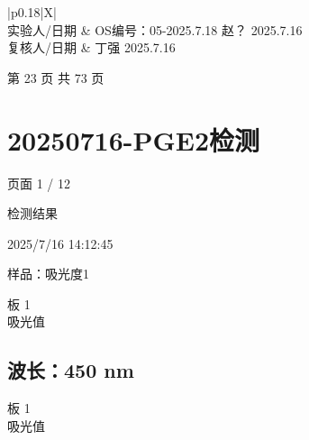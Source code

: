 \documentclass[UTF8,10pt,a4paper,fontset=fandol]{ctexart}
\newcommand{\fieldvalue}[1]{#1}
\newcommand{\handwritten}[1]{#1}
\begin{document}
\noindent
\begin{tabularx}{\textwidth}{|p{}|X|}
\hline
{}\\
\hline
实验人/日期 &
\fieldvalue{\handwritten{OS编号：05-2025.7.18}}
\hspace{2em}
\fieldvalue{\handwritten{赵？ 2025.7.16}}\\
\hline
复核人/日期 &
\fieldvalue{\handwritten{丁强 2025.7.16}}\\
\hline
\end{tabularx}

\vfill

\begin{center}
第 23 页 共 73 页
\end{center}

\newpage

\section*{20250716-PGE2检测}
\hfill 页面 1 / 12

\noindent
检测结果

\fieldvalue{2025/7/16 14:12:45}

\noindent
样品：吸光度1

\noindent
板 1\\
吸光值

\subsection*{波长：450 nm}

\noindent
板 1\\
吸光值
\end{document}
